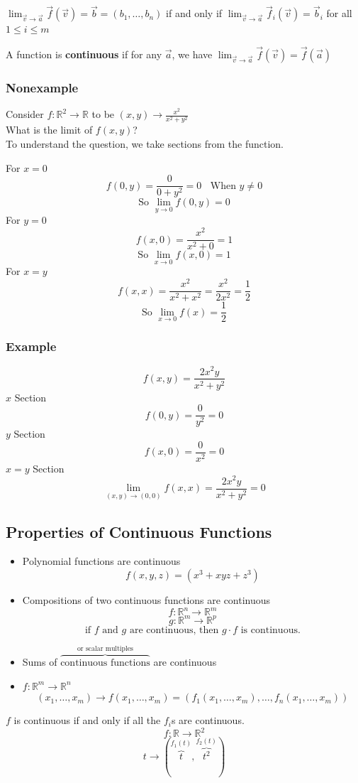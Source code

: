 \documentclass{article}
\begin{document}
$\lim_{\vec{v}\rightarrow\vec{a}}\vec{f}(\vec{v})=\vec{b}=(b_1,\dots,b_n)$ if and only if $\lim_{\vec{v}\rightarrow\vec{a}}\vec{f}_i(\vec{v})=\vec{b}_i$ for all $1\leq i\leq m$

A function is \textbf{continuous} if for any $\vec{a}$, we have $\lim_{\vec{v}\rightarrow\vec{a}}\vec{f}(\vec{v})=\vec{f}(\vec{a})$

\subsubsection*{Nonexample}

Consider $f:\mathbb{R}^2\rightarrow\mathbb{R}$ to be $(x,y)\rightarrow\frac{x^2}{x^2+y^2}$\\
What is the limit of $f(x,y)$?\\
To understand the question, we take sections from the function.

For $x=0$
\[f(0,y)=\frac{0}{0+y^2}=0\;\; \mbox{ When $y\neq0$}\]
\[\mbox{So }\lim_{y\rightarrow0}f(0,y)=0\]
For $y=0$
\[f(x,0)=\frac{x^2}{x^2+0}=1\]
\[\mbox{So }\lim_{x\rightarrow0}f(x,0)=1\]
For $x=y$
\[f(x,x)=\frac{x^2}{x^2+x^2}=\frac{x^2}{2x^2}=\frac{1}{2}\]
\[\mbox{So }\lim_{x\rightarrow0}f(x)=\frac{1}{2}\]

\subsubsection*{Example}
\[f(x,y)=\frac{2x^{2}y}{x^2+y^2}\]
$x$ Section
\[f(0,y)=\frac{0}{y^2}=0\]
$y$ Section
\[f(x,0)=\frac{0}{x^2}=0\]
$x=y$ Section
\[\lim_{(x,y)\rightarrow(0,0)}f(x,x)=\frac{2x^{2}y}{x^2+y^2}=0\]

\subsection{Properties of Continuous Functions}

\begin{itemize}
    \item Polynomial functions are continuous
    \[f(x,y,z)=(x^3+xyz+z^3)\]
    \item Compositions of two continuous functions are continuous
    \[f: \mathbb{R}^n\rightarrow\mathbb{R}^m\]
    \[g: \mathbb{R}^m\rightarrow\mathbb{R}^p\]
    \[\mbox{if $f$ and $g$ are continuous, then $g\cdot f$ is continuous.}\]
    \item Sums of $\overbrace{\mbox{continuous functions}}^{\mbox{or scalar multiples}}$ are continuous 
    \item $f: \mathbb{R}^m\rightarrow\mathbb{R}^n$
    \[(x_1,\ldots,x_m)\rightarrow f(x_1,\ldots,x_m)=(f_1(x_1,\ldots,x_m),\ldots,f_n(x_1,\ldots,x_m))\]
\end{itemize}
$f$ is continuous if and only if all the $f_i$s are continuous.
\[f:\mathbb{R}\rightarrow\mathbb{R}^2\]
\[t\rightarrow(\overbrace{t}^{f_1(t)},\overbrace{t^2}^{f_2(t)})\]
\end{document}
